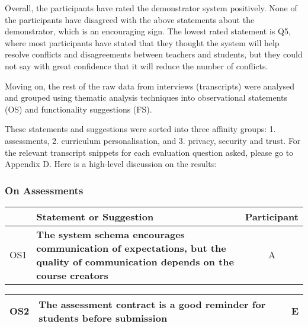 Overall, the participants have rated the demonstrator system positively.
None of the participants have disagreed with the above statements about the demonstrator,
which is an encouraging sign.
The lowest rated statement is Q5, where most participants have stated that 
they thought the system will help resolve conflicts and disagreements between 
teachers and students, but they could not say with great confidence 
that it will reduce the number of conflicts.

Moving on, the rest of the raw data from interviews (transcripts) were analysed and
grouped using thematic analysis techniques into
observational statements (OS) and functionality suggestions (FS).

These statements and suggestions were sorted into three affinity groups:
1. assessments, 2. curriculum personalisation, and 3. privacy, security and trust.
For the relevant transcript snippets for each evaluation question asked,
please go to Appendix D.
Here is a high-level discussion on the results:

\subsubsection{On Assessments}

\begin{table}[!ht]
	\begin{tabularx}{\textwidth}{|c|X|c|}
		\hline
		    & Statement or Suggestion                                                                                                              & Participant \\
		\hline
		OS1 & \textbf{The system schema encourages communication of expectations, but the quality of communication depends on the course creators} & A           \\
		\hline
	\end{tabularx}
\end{table}

\begin{table}[!ht]
	\begin{tabularx}{\textwidth}{|c|X|c|}
		\hline
		OS2 & \textbf{The assessment contract is a good reminder for students before submission} & E \\
		\hline
	\end{tabularx}
\end{table}

